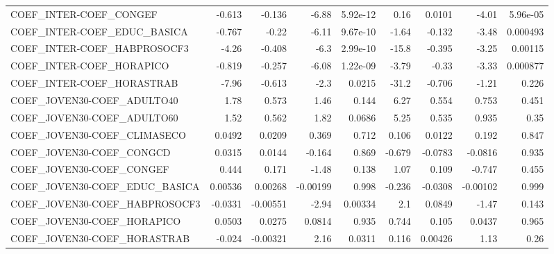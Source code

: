 \begin{tabular}{lrrrrrrrr}
COEF\_INTER-COEF\_CONGEF                &      -0.613 &       -0.136 &    -6.88 & 5.92e-12 &       0.16 &      0.0101 &        -4.01 &      5.96e-05 \\
COEF\_INTER-COEF\_EDUC\_BASICA           &      -0.767 &        -0.22 &    -6.11 & 9.67e-10 &      -1.64 &      -0.132 &        -3.48 &      0.000493 \\
COEF\_INTER-COEF\_HABPROSOCF3           &       -4.26 &       -0.408 &     -6.3 & 2.99e-10 &      -15.8 &      -0.395 &        -3.25 &       0.00115 \\
COEF\_INTER-COEF\_HORAPICO              &      -0.819 &       -0.257 &    -6.08 & 1.22e-09 &      -3.79 &       -0.33 &        -3.33 &      0.000877 \\
COEF\_INTER-COEF\_HORASTRAB             &       -7.96 &       -0.613 &     -2.3 &   0.0215 &      -31.2 &      -0.706 &        -1.21 &         0.226 \\
COEF\_JOVEN30-COEF\_ADULTO40            &        1.78 &        0.573 &     1.46 &    0.144 &       6.27 &       0.554 &        0.753 &         0.451 \\
COEF\_JOVEN30-COEF\_ADULTO60            &        1.52 &        0.562 &     1.82 &   0.0686 &       5.25 &       0.535 &        0.935 &          0.35 \\
COEF\_JOVEN30-COEF\_CLIMASECO           &      0.0492 &       0.0209 &    0.369 &    0.712 &      0.106 &      0.0122 &        0.192 &         0.847 \\
COEF\_JOVEN30-COEF\_CONGCD              &      0.0315 &       0.0144 &   -0.164 &    0.869 &     -0.679 &     -0.0783 &      -0.0816 &         0.935 \\
COEF\_JOVEN30-COEF\_CONGEF              &       0.444 &        0.171 &    -1.48 &    0.138 &       1.07 &       0.109 &       -0.747 &         0.455 \\
COEF\_JOVEN30-COEF\_EDUC\_BASICA         &     0.00536 &      0.00268 & -0.00199 &    0.998 &     -0.236 &     -0.0308 &     -0.00102 &         0.999 \\
COEF\_JOVEN30-COEF\_HABPROSOCF3         &     -0.0331 &     -0.00551 &    -2.94 &  0.00334 &        2.1 &      0.0849 &        -1.47 &         0.143 \\
COEF\_JOVEN30-COEF\_HORAPICO            &      0.0503 &       0.0275 &   0.0814 &    0.935 &      0.744 &       0.105 &       0.0437 &         0.965 \\
COEF\_JOVEN30-COEF\_HORASTRAB           &      -0.024 &     -0.00321 &     2.16 &   0.0311 &      0.116 &     0.00426 &         1.13 &          0.26 \\

\end{tabular}
